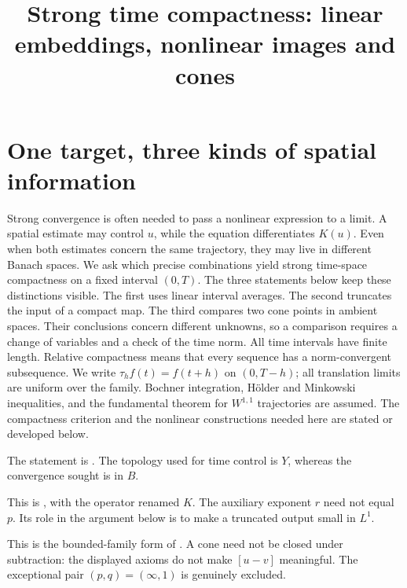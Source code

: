 \documentclass[12pt,reqno]{amsart}
\title{Strong time compactness: linear embeddings, nonlinear images and cones}
\date{}
\begin{document}
\maketitle
\section{One target, three kinds of spatial information}
Strong convergence is often needed to pass a nonlinear expression to a limit. A spatial estimate may control $u$, while the equation differentiates $K(u)$. Even when both estimates concern the same trajectory, they may live in different Banach spaces. We ask which precise combinations yield strong time-space compactness on a fixed interval $(0,T)$.
The three statements below keep these distinctions visible. The first uses linear interval averages. The second truncates the input of a compact map. The third compares two cone points in ambient spaces. Their conclusions concern different unknowns, so a comparison requires a change of variables and a check of the time norm.
All time intervals have finite length. Relative compactness means that every sequence has a norm-convergent subsequence. We write $\tau_h f(t)=f(t+h)$ on $(0,T-h)$; all translation limits are uniform over the family. Bochner integration, H\"older and Minkowski inequalities, and the fundamental theorem for $W^{1,1}$ trajectories are assumed. The compactness criterion and the nonlinear constructions needed here are stated or developed below.
\begin{theorem}[Simon]\label{thm:simon}

\end{theorem}
The statement is \cite[Theorem 5, pp.~84--85]{S-simon}. The topology used for time control is $Y$, whereas the convergence sought is in $B$.

\begin{theorem}[Maitre]\label{thm:maitre}

\end{theorem}
This is \cite[Theorem 2.1, p.~1726]{S-maitre}, with the operator renamed $K$. The auxiliary exponent $r$ need not equal $p$. Its role in the argument below is to make a truncated output small in $L^1$.

\begin{theorem}\label{thm:cone}

\end{theorem}
This is the bounded-family form of \cite[Theorem 1 and Remark 2, pp.~3--4]{S-barrett-suli}. A cone need not be closed under subtraction: the displayed axioms do not make $[u-v]$ meaningful. The exceptional pair $(p,q)=(\infty,1)$ is genuinely excluded.
\end{document}
